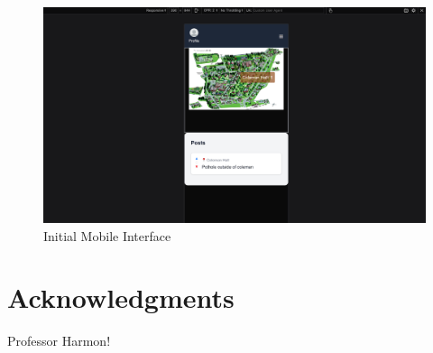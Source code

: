 \documentclass{article}
\begin{document}
\begin{figure}
    \centering
    \includegraphics[width=0.5\linewidth]{mobile.png}
    \caption{Initial Mobile Interface}
    \label{fig:mobile}
\end{figure}

\newpage

\section{Acknowledgments}
Professor Harmon! 
\end{document}
